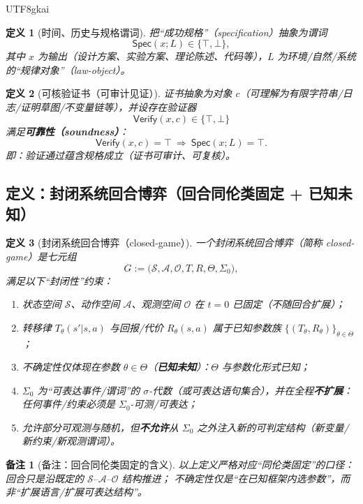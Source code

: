\documentclass[12pt]{article}
\newtheorem{definition}{定义}[section]
\newtheorem{remark}{备注}[section]
\begin{document}
\begin{CJK*}{UTF8}{gkai}
\begin{definition}[时间、历史与规格谓词]
把“成功规格”（specification）抽象为谓词
\[
  \mathsf{Spec}(x;L)\in\{\top,\bot\},
\]
其中 $x$ 为输出（设计方案、实验方案、理论陈述、代码等），$L$ 为环境/自然/系统的“规律对象”（law-object）。
\end{definition}

\begin{definition}[可核验证书（可审计见证）]
证书抽象为对象 $c$（可理解为有限字符串/日志/证明草图/不变量链等），并设存在验证器
\[
  \mathsf{Verify}(x,c)\in\{\top,\bot\}
\]
满足\textbf{可靠性（soundness）}：
\[
  \mathsf{Verify}(x,c)=\top\ \Rightarrow\ \mathsf{Spec}(x;L)=\top.
\]
即：验证通过蕴含规格成立（证书可审计、可复核）。
\end{definition}

\subsection{定义：封闭系统回合博弈（回合同伦类固定 + 已知未知）}
\label{subsec:tex25-closed-game}

\begin{definition}[封闭系统回合博弈（closed-game）]
一个封闭系统回合博弈（简称 closed-game）是七元组
\[
  G:=\bigl(\mathcal{S},\mathcal{A},\mathcal{O},T,R,\Theta,\Sigma_0\bigr),
\]
满足以下“封闭性”约束：
\begin{enumerate}
  \item 状态空间 $\mathcal{S}$、动作空间 $\mathcal{A}$、观测空间 $\mathcal{O}$ 在 $t=0$ 已固定（不随回合扩展）；
  \item 转移律 $T_\theta(s'|s,a)$ 与回报/代价 $R_\theta(s,a)$ 属于已知参数族 $\{(T_\theta,R_\theta)\}_{\theta\in\Theta}$；
  \item 不确定性仅体现在参数 $\theta\in\Theta$（\textbf{已知未知}）：$\Theta$ 与参数化形式已知；
  \item $\Sigma_0$ 为“可表达事件/谓词”的 $\sigma$-代数（或可表达语句集合），并在全程\textbf{不扩展}：
  任何事件/约束必须是 $\Sigma_0$-可测/可表达；
  \item 允许部分可观测与随机，但\textbf{不允许}从 $\Sigma_0$ 之外注入新的可判定结构（新变量/新约束/新观测谓词）。
\end{enumerate}
\end{definition}

\begin{remark}[备注：回合同伦类固定的含义]
以上定义严格对应“同伦类固定”的口径：回合只是沿既定的 $\mathcal{S}\text{--}\mathcal{A}\text{--}\mathcal{O}$ 结构推进；
不确定性仅是“在已知框架内选参数”，而非“扩展语言/扩展可表达结构”。
\end{remark}


\end{CJK*}
\end{document}
